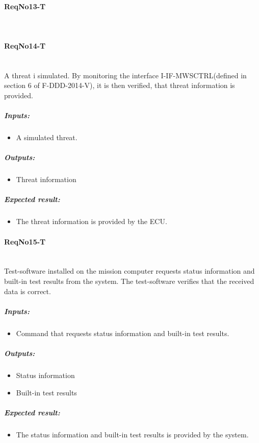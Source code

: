\paragraph{ReqNo13-T}\mbox{}\\ %

\paragraph{ReqNo14-T}\mbox{}\\ %
A threat i simulated. By monitoring the interface I-IF-MWSCTRL(defined in section 6 of F-DDD-2014-V), it is then verified, that threat information is provided.

	\subparagraph{Inputs:}
	\begin{itemize}
	\item A simulated threat. 
	\end{itemize}
	\subparagraph{Outputs:}
	\begin{itemize}
	\item Threat information
	\end{itemize}
	\subparagraph{Expected result:}
	\begin{itemize}
	\item The threat information is provided by the ECU.
	\end{itemize}
	

\paragraph{ReqNo15-T}\mbox{}\\ %
Test-software installed on the mission computer requests status information and built-in test results from the system. The test-software verifies that the received data is correct.
\\
	\subparagraph{Inputs:}
	\begin{itemize}
	\item Command that requests status information and built-in test results. 
	\end{itemize}
	\subparagraph{Outputs:}
	\begin{itemize}
	\item Status information
	\item Built-in test results
	\end{itemize}
	\subparagraph{Expected result:}
	\begin{itemize}
	\item The status information and built-in test results is provided by the system.
	\end{itemize}


